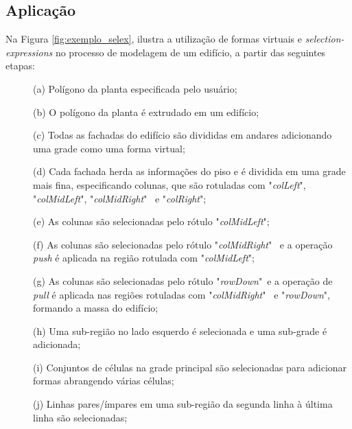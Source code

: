 \subsection{Aplicação}
\label{sec:selex_modelagem}

Na Figura \ref{fig:exemplo_selex},  ilustra a utilização de formas virtuais e \textit{selection-expressions} no processo de modelagem de um edifício, a partir das seguintes etapas:

\begin{description}
    \item[] \; (a) Polígono da planta especificada pelo usuário;
    
    \item[] \; (b) O polígono da planta é extrudado em um edifício;
    
    \item[] \; (c) Todas as fachadas do edifício são divididas em andares adicionando uma grade como uma forma virtual;
    
    \item[] \; (d) Cada fachada herda as informações do piso e é dividida em uma grade mais fina, especificando colunas, que são rotuladas com "\textit{colLeft}", "\textit{colMidLeft}", "\textit{colMidRight}" \, e "\textit{colRight}";
    
    \item[] \; (e) As colunas são selecionadas pelo rótulo "\textit{colMidLeft}";
    
    \item[] \; (f) As colunas são selecionadas pelo rótulo "\textit{colMidRight}" \, e a operação \textit{push} é aplicada na região rotulada com "\textit{colMidLeft}";
    
    \item[] \; (g) As colunas são selecionadas pelo rótulo "\textit{rowDown}" \,e a operação de \textit{pull} é aplicada nas regiões rotuladas com "\textit{colMidRight}" \, e "\textit{rowDown}", formando a massa do edifício;
    
    \item[] \; (h) Uma sub-região no lado esquerdo é selecionada e uma sub-grade é adicionada;
    
    \item[] \; (i) Conjuntos de células na grade principal são selecionadas para adicionar formas abrangendo várias células;
    
    \item[] \; (j) Linhas pares/ímpares em uma sub-região da segunda linha à última linha são selecionadas;
    

\end{description}
